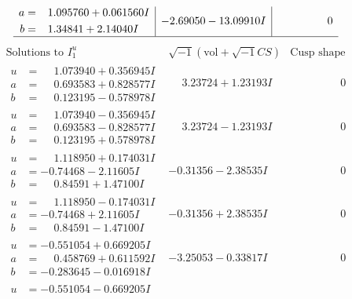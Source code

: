 \documentclass[1p]{elsarticle_modified}
\theoremstyle{definition}
\newcommand{\I}{\sqrt{-1}}
\begin{document}
$$\begin{array}{c|c|c}
\begin{aligned}
a &= \phantom{-}1.095760 + 0.061560 I \\
b &= \phantom{-}1.34841 + 2.14040 I\end{aligned}
 & -2.69050 - 13.09910 I & \phantom{-0.000000 } 0\\
 \hline 
 \end{array}$$\newpage$$\begin{array}{c|c|c}  
\text{Solutions to }I^u_{1}& \I (\text{vol} + \sqrt{-1}CS) & \text{Cusp shape}\\
 \hline 
\begin{aligned}
u &= \phantom{-}1.073940 + 0.356945 I \\
a &= \phantom{-}0.693583 + 0.828577 I \\
b &= \phantom{-}0.123195 - 0.578978 I\end{aligned}
 & \phantom{-}3.23724 + 1.23193 I & \phantom{-0.000000 } 0 \\ \hline\begin{aligned}
u &= \phantom{-}1.073940 - 0.356945 I \\
a &= \phantom{-}0.693583 - 0.828577 I \\
b &= \phantom{-}0.123195 + 0.578978 I\end{aligned}
 & \phantom{-}3.23724 - 1.23193 I & \phantom{-0.000000 } 0 \\ \hline\begin{aligned}
u &= \phantom{-}1.118950 + 0.174031 I \\
a &= -0.74468 - 2.11605 I \\
b &= \phantom{-}0.84591 + 1.47100 I\end{aligned}
 & -0.31356 - 2.38535 I & \phantom{-0.000000 } 0 \\ \hline\begin{aligned}
u &= \phantom{-}1.118950 - 0.174031 I \\
a &= -0.74468 + 2.11605 I \\
b &= \phantom{-}0.84591 - 1.47100 I\end{aligned}
 & -0.31356 + 2.38535 I & \phantom{-0.000000 } 0 \\ \hline\begin{aligned}
u &= -0.551054 + 0.669205 I \\
a &= \phantom{-}0.458769 + 0.611592 I \\
b &= -0.283645 - 0.016918 I\end{aligned}
 & -3.25053 - 0.33817 I & \phantom{-0.000000 } 0 \\ \hline\begin{aligned}
u &= -0.551054 - 0.669205 I \\

\end{aligned}
\end{array}$$
\end{document}
